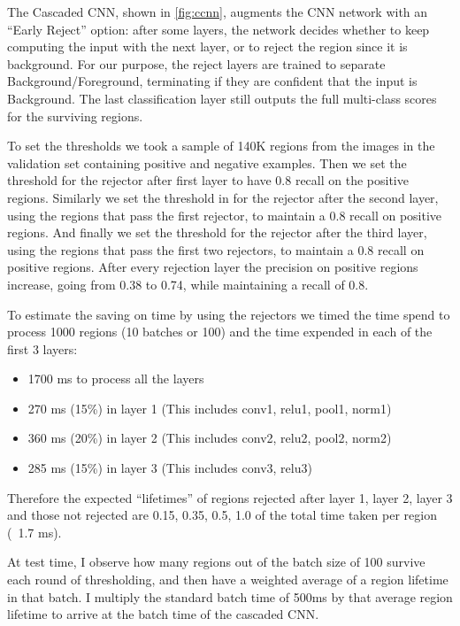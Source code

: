 The Cascaded CNN, shown in \autoref{fig:ccnn}, augments the CNN network with an ``Early Reject'' option: after some layers, the network decides whether to keep computing the input with the next layer, or to reject the region since it is background.
For our purpose, the reject layers are trained to separate Background/Foreground, terminating if they are confident that the input is Background. The last classification layer still outputs the full multi-class scores for the surviving regions.

To set the thresholds we took a sample of 140K regions from the images in the validation set containing positive and negative examples. Then we set the threshold for the rejector after first layer to have 0.8 recall on the positive regions. Similarly we set the threshold in for the rejector after the second layer, using the regions that pass the first rejector, to maintain a 0.8 recall on positive regions. And finally we set the threshold for the rejector after the third layer, using the regions that pass the first two rejectors, to maintain a 0.8 recall on positive regions. After every rejection layer the precision on positive regions increase, going from 0.38 to 0.74, while maintaining a recall of 0.8.

To estimate the saving on time by using the rejectors we timed the time spend to process 1000 regions (10 batches or 100) and the time expended in each of the first 3 layers:
\begin{itemize}
\item 1700 ms to process all the layers
\item 270 ms (15\%) in layer 1 (This includes conv1, relu1, pool1, norm1)
\item 360 ms (20\%) in layer 2 (This includes conv2, relu2, pool2, norm2)
\item 285 ms (15\%) in layer 3 (This includes conv3, relu3)
\end{itemize}

Therefore the expected ``lifetimes'' of regions rejected after layer 1, layer 2, layer 3 and those not rejected are  0.15, 0.35, 0.5, 1.0 of the total time taken per region (~1.7 ms).

At test time, I observe how many regions out of the batch size of 100 survive each round of thresholding, and then have a weighted average of a region lifetime in that batch. I multiply the standard batch time of 500ms by that average region lifetime to arrive at the batch time of the cascaded CNN.

